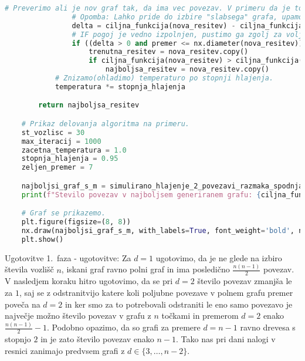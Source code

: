 \documentclass[12pt,a4paper]{amsart}
\makeatletter
\renewcommand\section{\@startsection{section}{1}%
  \z@{.5\linespacing\@plus.7\linespacing}{.5\linespacing}%
  {\normalfont\scshape\large\centering}}
\renewcommand\subsection{\@startsection{subsection}{2}%
  \z@{.5\linespacing\@plus.7\linespacing}{.5\linespacing}%
  {\normalfont\scshape}}
\theoremstyle{definition} %
\theoremstyle{plain} %
\makeatother
\begin{document}
\begin{lstlisting}[language=Python]
                # Preverimo ali je nov graf tak, da ima vec povezav. V primeru da je to res, posodobimo najboljso resitev, sicer pa z verjetnostjo izberemo ali bomo posodobili trenutno resitev ali ne.
                # Opomba: Lahko pride do izbire "slabsega" grafa, upamo, da nas bo ta "slabsi" vseeno pripeljal do boljse resitve v nadaljevanju.
                delta = ciljna_funkcija(nova_resitev) - ciljna_funkcija(trenutna_resitev)
                # IF pogoj je vedno izpolnjen, pustimo ga zgolj za voljo testiranja.
                if ((delta > 0 and premer <= nx.diameter(nova_resitev)) or random.random() < math.exp(-delta / temperatura)) and nx.is_connected(nova_resitev):
                    trenutna_resitev = nova_resitev.copy()
                    if ciljna_funkcija(nova_resitev) > ciljna_funkcija(najboljsa_resitev) and premer == nx.diameter(nova_resitev):
                        najboljsa_resitev = nova_resitev.copy()
            # Znizamo(ohladimo) temperaturo po stopnji hlajenja.
            temperatura *= stopnja_hlajenja

        return najboljsa_resitev

    # Prikaz delovanja algoritma na primeru.
    st_vozlisc = 30
    max_iteracij = 1000
    zacetna_temperatura = 1.0
    stopnja_hlajenja = 0.95
    zeljen_premer = 7

    najboljsi_graf_s_m = simulirano_hlajenje_2_povezavi_razmaka_spodnja_meja(st_vozlisc, max_iteracij, zacetna_temperatura, stopnja_hlajenja, zeljen_premer)
    print(f"Stevilo povezav v najboljsem generiranem grafu: {ciljna_funkcija(najboljsi_graf_s_m)}")

    # Graf se prikazemo.
    plt.figure(figsize=(8, 8))
    nx.draw(najboljsi_graf_s_m, with_labels=True, font_weight='bold', node_color='skyblue', node_size=800, font_size=10)
    plt.show()
\end{lstlisting}

\pagebreak
\section{Ugotovitve}
\subsection{1.\ faza - ugotovitve:}
\noindent Za $d = 1$ ugotovimo, da je ne glede
na izbiro števila vozlišč $n$, iskani graf ravno polni graf in ima posledično
$\frac{n (n - 1)}{2}$ povezav. V nasledjem koraku hitro ugotovimo, da se pri $d = 2$ število
povezav zmanjša le za $1$, saj se z odstranitvijo katere koli poljubne povezave v polnem grafu
premer poveča na $d = 2$ in ker smo za to potrebovali odstraniti le eno samo povezavo je največje
možno število povezav v grafu z $n$ točkami in premerom $d = 2$ enako $\frac{n (n - 1)}{2} - 1$.
Podobno opazimo, da so grafi za premere $d = n - 1$ ravno drevesa s stopnjo $2$ in je zato število
povezav enako $n - 1$. Tako nas pri dani nalogi v resnici zanimajo predvsem grafi z
$d \in \{3, \dots, n - 2\}$.
\end{document}
